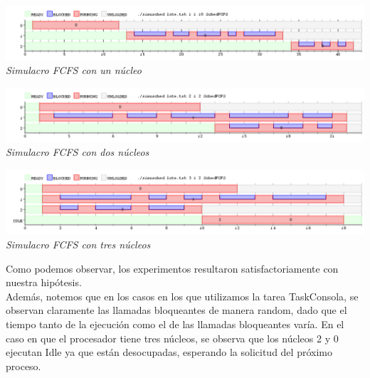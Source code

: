 \vspace{\baselineskip}
\begin{center}
\includegraphics[scale=0.45]{../tp1/Test/resEj2Co1.png}
\\
\vspace{1pt}
\footnotesize\textit{Simulacro FCFS con un n\'ucleo}
\end{center}
\vspace{\baselineskip}


\vspace{\baselineskip}
\begin{center}
\includegraphics[scale=0.45]{../tp1/Test/resEj2Co2.png}
\\
\vspace{1pt}
\footnotesize\textit{Simulacro FCFS con dos n\'ucleos}
\end{center}
\vspace{\baselineskip}

\vspace{\baselineskip}
\begin{center}
\includegraphics[scale=0.45]{../tp1/Test/resEj2Co3.png}
\\
\vspace{1pt}
\footnotesize\textit{Simulacro FCFS con tres n\'ucleos}
\end{center}
\vspace{\baselineskip}


Como podemos observar, los experimentos resultaron satisfactoriamente con nuestra hip\'otesis.\\
Adem\'as, notemos que en los casos en los que utilizamos la tarea TaskConsola, se observan claramente las llamadas bloqueantes de manera random, dado que el tiempo tanto de la ejecuci\'on como el de las llamadas bloqueantes var\'ia.
En el caso en que el procesador tiene tres n\'ucleos, se observa que los n\'ucleos 2 y 0 ejecutan Idle ya que est\'an desocupadas, esperando la solicitud del pr\'oximo proceso.

